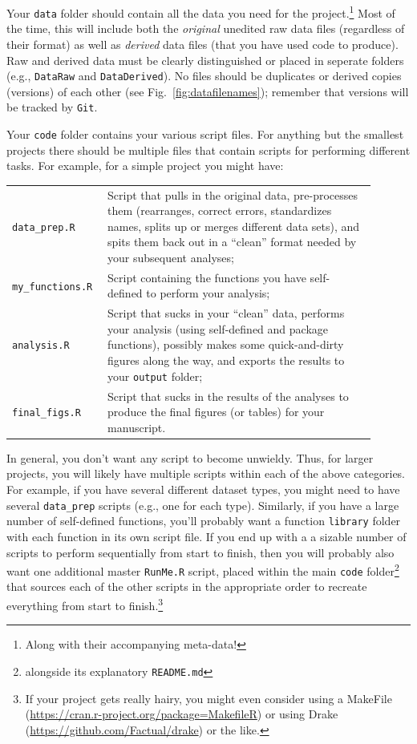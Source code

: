 \documentclass[12pt,letterpaper]{article}
\begin{document}
Your \texttt{data} folder should contain all the data you need for the project.\footnote{Along with their accompanying meta-data!}
Most of the time, this will include both the \emph{original} unedited raw data files (regardless of their format) as well as \emph{derived} data files (that you have used code to produce).
Raw and derived data must be clearly distinguished or placed in seperate folders (e.g., \texttt{DataRaw} and \texttt{DataDerived}).
No files should be duplicates or derived copies (versions) of each other (see Fig.~\ref{fig:datafilenames});
remember that versions will be tracked by \texttt{Git}.

Your \texttt{code} folder contains your various script files.
For anything but the smallest projects there should be multiple files that contain scripts for performing different tasks.
For example, for a simple project you might have:

\begin{tabular}{p{0.2\linewidth}p{0.7\linewidth}}
	\texttt{data\_prep.R} & Script that pulls in the original data,
	pre-processes them (rearranges, correct errors, standardizes names, splits up or merges different data sets),
	and spits them back out in a ``clean'' format needed by your subsequent analyses; \\
	\texttt{my\_functions.R} & Script containing the functions you have self-defined to perform your analysis; \\
	\texttt{analysis.R} & Script that sucks in your ``clean'' data,
	performs your analysis (using self-defined and package functions),
	possibly makes some quick-and-dirty figures along the way,
	and exports the results to your \texttt{output} folder; \\
	\texttt{final\_figs.R} & Script that sucks in the results of the analyses to produce the final figures (or tables) for your manuscript.
\end{tabular}

In general, you don't want any script to become unwieldy.
Thus, for larger projects, you will likely have multiple scripts within each of the above categories.
For example, if you have several different dataset types, you might need to have several \texttt{data\_prep} scripts (e.g., one for each type).
Similarly, if you have a large number of self-defined functions, you'll probably want a function \texttt{library} folder with each function in its own script file.
If you end up with a a sizable number of scripts to perform sequentially from start to finish,
then you will probably also want one additional master \texttt{RunMe.R} script, placed within the main \texttt{code} folder\footnote{alongside its explanatory \texttt{README.md}} that sources each of the other scripts in the appropriate order to recreate everything from start to finish.\footnote{If your project gets really hairy, you might even consider using a MakeFile (\url{https://cran.r-project.org/package=MakefileR}) or using Drake (\url{https://github.com/Factual/drake}) or the like.}
\end{document}
